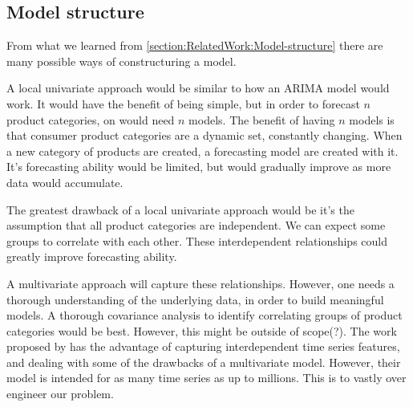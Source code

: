 \subsection{Model structure}



From what we learned from \autoref{section:RelatedWork:Model-structure}
there are many possible ways of constructuring a model.

A local univariate approach would be similar to how an ARIMA model would work.
It would have the benefit of being simple, but in order to forecast $n$ product categories, 
on would need $n$ models.
The benefit of having $n$ models is that consumer product categories are a dynamic set, constantly changing.
When a new category of products are created, a forecasting model are created with it. It's forecasting ability
would be limited, but would gradually improve as more data would accumulate.

The greatest drawback of a local univariate approach would be it's the assumption that all product categories
are independent. We can expect some groups to correlate with each other. These interdependent relationships
could greatly improve forecasting ability.

A multivariate approach will capture these relationships.
However, one needs a thorough understanding of the underlying data, in order to build meaningful models.
A thorough covariance analysis to identify correlating groups of product categories would be best.
However, this might be outside of scope(?).
The work proposed by \cite{Sen2019} has the advantage of capturing interdependent time series features, and dealing with
some of the drawbacks of a multivariate model. However, their model is intended for as many time series as up to millions.
This is to vastly over engineer our problem.

